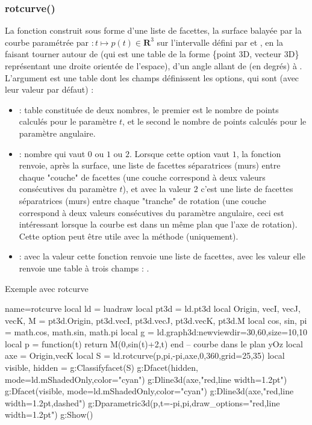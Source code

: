 \subsubsection{rotcurve()}
La fonction  construit sous forme d'une liste de facettes, la surface balayée par la courbe paramétrée par $\colon t\mapsto p(t)\in \mathbf R^3$ sur l'intervalle défini par  et , en la faisant tourner autour de  (qui est une table de la forme \{point 3D, vecteur 3D\} représentant une droite orientée de l'espace), d'un angle allant de  (en degrés) à . L'argument  est une table dont les champs définissent les options, qui sont (avec leur valeur  par défaut) :
    \begin{itemize}
        \item {} : table constituée de deux nombres, le premier est le nombre de points calculés pour le paramètre $t$, et le second le nombre de points calculés pour le paramètre angulaire.

        \item {} : nombre qui vaut $0$ ou $1$ ou $2$. Lorsque cette option vaut $1$, la fonction renvoie, après la surface, une liste de facettes séparatrices (murs) entre chaque "couche" de facettes (une couche correspond à deux valeurs consécutives du paramètre $t$), et avec la valeur $2$ c'est une liste de facettes séparatrices (murs) entre chaque "tranche" de rotation (une couche correspond à deux valeurs consécutives du paramètre angulaire, ceci est intéressant lorsque la courbe est dans un même plan que l'axe de rotation). Cette option peut être utile avec la méthode  (uniquement).
        
        \item {} : avec la valeur \false cette fonction renvoie une liste de facettes, avec les valeur \true elle renvoie une table à trois champs : .           
    \end{itemize} 
        
\begin{demo}{Exemple avec rotcurve}
\begin{luadraw}{name=rotcurve}
local ld = luadraw
local pt3d = ld.pt3d
local Origin, vecI, vecJ, vecK, M = pt3d.Origin, pt3d.vecI, pt3d.vecJ, pt3d.vecK, pt3d.M
local cos, sin, pi = math.cos, math.sin, math.pi
local g = ld.graph3d:new{viewdir={30,60},size={10,10}}
local p = function(t) return M(0,sin(t)+2,t) end -- courbe dans le plan yOz
local axe = {Origin,vecK}
local S = ld.rotcurve(p,pi,-pi,axe,0,360,{grid={25,35}})
local visible, hidden = g:Classifyfacet(S)
g:Dfacet(hidden, {mode=ld.mShadedOnly,color="cyan"})
g:Dline3d(axe,"red,line width=1.2pt")
g:Dfacet(visible, {mode=ld.mShadedOnly,color="cyan"})
g:Dline3d(axe,"red,line width=1.2pt,dashed")
g:Dparametric3d(p,{t={-pi,pi},draw_options="red,line width=1.2pt"})
g:Show()
\end{luadraw}
\end{demo}

